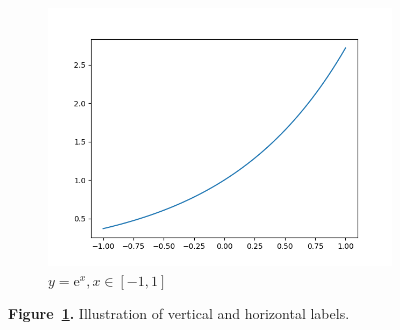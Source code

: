 \begin{figure}
\begin{subfigure}{0.3\linewidth}
        \includegraphics[width=\linewidth]{../figures/exp.png}
        \caption{\(y=\mathrm{e}^x, x\in[-1,1]\)}
    \end{subfigure}
    \caption{\textbf{Figure~\ref{Figure-VHLabels}.} Illustration of vertical and horizontal labels.}\label{Figure-VHLabels}
\end{figure}

